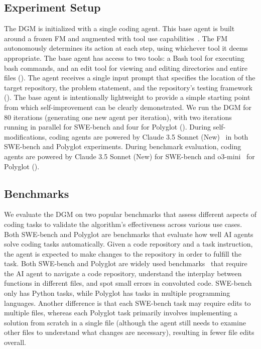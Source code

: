 \documentclass{article}
\begin{document}
\subsection{Experiment Setup}
\label{sec:experiment-setup}


The DGM is initialized with a single coding agent. This base agent is built around a frozen FM and augmented with tool use capabilities~\citep{schick2023toolformer, anthropic_tool_use_2024}. The FM autonomously determines its action at each step, using whichever tool it deems appropriate. The base agent has access to two tools: a Bash tool for executing bash commands, and an edit tool for viewing and editing directories and entire files (). The agent receives a single input prompt that specifies the location of the target repository, the problem statement, and the repository's testing framework (). The base agent is intentionally lightweight to provide a simple starting point from which self-improvement can be clearly demonstrated. We run the DGM for 80 iterations (generating one new agent per iteration), with two iterations running in parallel for SWE-bench and four for Polyglot (). During self-modifications, coding agents are powered by Claude 3.5 Sonnet (New)~\citep{anthropic2024claude35sonnet} in both SWE-bench and Polyglot experiments. During benchmark evaluation, coding agents are powered by Claude 3.5 Sonnet (New) for SWE-bench and o3-mini~\citep{openai2025o3mini} for Polyglot ().


\subsection{Benchmarks}
\label{sec:benchmarks}


We evaluate the DGM on two popular benchmarks that assess different aspects of coding tasks to validate the algorithm's effectiveness across various use cases. Both SWE-bench and Polyglot are benchmarks that evaluate how well AI agents solve coding tasks automatically. Given a code repository and a task instruction, the agent is expected to make changes to the repository in order to fulfill the task. Both SWE-bench and Polyglot are widely used benchmarks~\citep{zhang2024autocoderover, zhang2024rest, xia2024agentless, cao2024spider2, GoogleDeepMind2025GeminiThinking,aider2024} that require the AI agent to navigate a code repository, understand the interplay between functions in different files, and spot small errors in convoluted code. SWE-bench only has Python tasks, while Polyglot has tasks in multiple programming languages. Another difference is that each SWE-bench task may require edits to multiple files, whereas each Polyglot task primarily involves implementing a solution from scratch in a single file (although the agent still needs to examine other files to understand what changes are necessary), resulting in fewer file edits overall.
\end{document}
